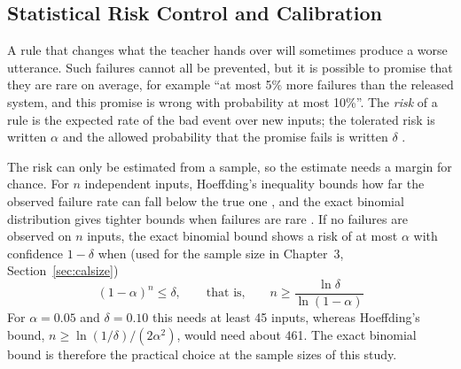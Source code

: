 \subsection{Statistical Risk Control and Calibration}
\label{sec:rrl-risk}

A rule that changes what the teacher hands over will sometimes produce a worse utterance. Such failures cannot all be prevented, but it is possible to promise that they are rare on average, for example ``at most 5\% more failures than the released system, and this promise is wrong with probability at most 10\%''. The \emph{risk} of a rule is the expected rate of the bad event over new inputs; the tolerated risk is written $\alpha$ and the allowed probability that the promise fails is written $\delta$ \parencite{angelopoulos2023gentle}.

The risk can only be estimated from a sample, so the estimate needs a margin for chance. For $n$ independent inputs, Hoeffding's inequality bounds how far the observed failure rate can fall below the true one \parencite{hoeffding1963}, and the exact binomial distribution gives tighter bounds when failures are rare \parencite{clopper1934}. If no failures are observed on $n$ inputs, the exact binomial bound shows a risk of at most $\alpha$ with confidence $1-\delta$ when (used for the sample size in Chapter~3, Section~\ref{sec:calsize})
\begin{equation}
(1-\alpha)^n\le\delta, \qquad\text{that is,}\qquad n \ge \frac{\ln\delta}{\ln(1-\alpha)}
\label{eq:rrl-zerofail}
\end{equation}
For $\alpha=0.05$ and $\delta=0.10$ this needs at least 45 inputs, whereas Hoeffding's bound, $n\ge\ln(1/\delta)/(2\alpha^2)$, would need about 461. The exact binomial bound is therefore the practical choice at the sample sizes of this study.

